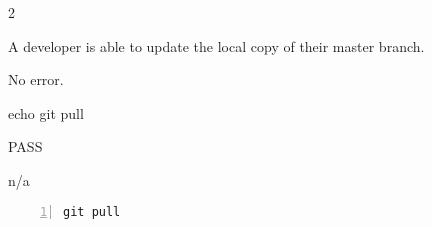 \begin{description}[align=right,leftmargin=3.2cm,labelindent=3.0cm]
\item[Step:] 2
\item[Confirm:] A developer is able to update the local copy of their master branch.
\item[Expectation:] No error.
\item[Command:] echo git  pull
\item[Test Result:] PASS
\item[Evidence:] n/a
\end{description}
\begin{lstlisting}[numbers=left]
git pull

\end{lstlisting}
